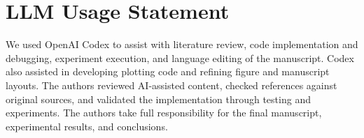 \section*{LLM Usage Statement}
\label{sec:llm_usage}
We used OpenAI Codex to assist with literature review, code implementation and
debugging, experiment execution, and language editing of the manuscript. Codex
also assisted in developing plotting code and refining figure and manuscript
layouts. The authors reviewed AI-assisted content, checked references against
original sources, and validated the implementation through testing and experiments.
The authors take full responsibility for the final manuscript, experimental
results, and conclusions.
